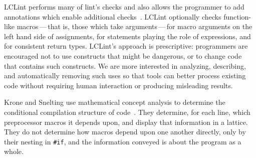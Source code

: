 \documentclass[11pt]{article}
\begin{document}
LCLint performs many of lint's checks and also
allows the programmer to add annotations which enable additional
checks~\cite{Evans-pldi96,Evans-fse94}.
LCLint optionally checks function-like
macros\,---\,that is, those which take arguments\,---\,for
macro arguments on the left hand side of assignments, for statements
playing the role of expressions, and for consistent return types.
LCLint's approach is prescriptive: programmers are encouraged not to use
constructs that might be dangerous, or to change code that contains such
constructs.  We are more interested in analyzing, describing, and
automatically removing such uses so that tools can better process existing
code without requiring human interaction or producing misleading results.


Krone and Snelting use mathematical concept analysis to determine the
conditional compilation structure of code~\cite{Krone94}.  They determine,
for each line, which preprocessor macros it depends upon, and display that
information in a lattice.  They do not determine how macros depend upon one
another directly, only by their nesting in {\tt \#if}, and the information
conveyed is about the program as a whole.


{\small }
\end{document}
